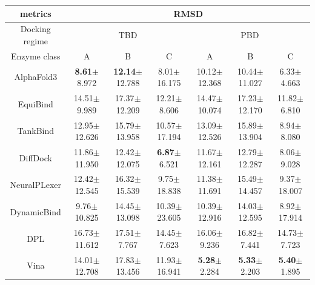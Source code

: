 \documentclass[12pt, a4paper, portrait]{article}
\begin{document}
    \begin{table}
        \begin{tabular}{|c|*{6}{c}|}
            \hline
            metrics & \multicolumn{6}{|c|}{RMSD} \\
            \hline

            Docking regime & \multicolumn{3}{|c|}{TBD} & \multicolumn{3}{|c|}{PBD} \\
            \hline

            Enzyme class & A & B & C & A & B & C \\
            AlphaFold3&\textbf{8.61}$\pm$ 8.972&\textbf{12.14}$\pm$ 12.788&8.01$\pm$ 16.175&10.12$\pm$ 12.368&10.44$\pm$ 11.027&6.33$\pm$ 4.663\\ 
            EquiBind&14.51$\pm$ 9.989&17.37$\pm$ 12.209&12.21$\pm$ 8.606&14.47$\pm$ 10.074&17.23$\pm$ 12.170&11.82$\pm$ 6.810\\ 
            TankBind&12.95$\pm$ 12.626&15.79$\pm$ 13.958&10.57$\pm$ 17.194&13.09$\pm$ 12.526&15.89$\pm$ 13.904&8.94$\pm$ 8.080\\ 
            DiffDock&11.86$\pm$ 11.950&12.42$\pm$ 12.075&\textbf{6.87}$\pm$ 6.521&11.67$\pm$ 12.161&12.79$\pm$ 12.287&8.06$\pm$ 9.028\\ 
            NeuralPLexer&12.42$\pm$ 12.545&16.32$\pm$ 15.539&9.75$\pm$ 18.838&11.38$\pm$ 11.691&15.49$\pm$ 14.457&9.37$\pm$ 18.007\\ 
            DynamicBind&9.76$\pm$ 10.825&14.45$\pm$ 13.098&10.39$\pm$ 23.605&10.39$\pm$ 12.916&14.03$\pm$ 12.595&8.92$\pm$ 17.914\\ 
            DPL&16.73$\pm$ 11.612&17.51$\pm$ 7.767&14.45$\pm$ 7.623&16.06$\pm$ 9.236&16.82$\pm$ 7.441&14.73$\pm$ 7.723\\ 
            Vina&14.01$\pm$ 12.708&17.83$\pm$ 13.456&11.93$\pm$ 16.941&\textbf{5.28}$\pm$ 2.284&\textbf{5.33}$\pm$ 2.203&\textbf{5.40}$\pm$ 1.895\\

        \end{tabular}
    \end{table}
\end{document}
